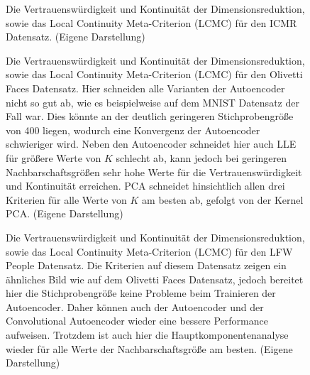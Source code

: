 \begin{figure}[ht]
	\begin{center}
		
	\end{center}
	\caption[ICMR Qualitätskriterien]{Die Vertrauenswürdigkeit und Kontinuität der Dimensionsreduktion, sowie das Local Continuity Meta-Criterion (LCMC) für den ICMR Datensatz. (Eigene Darstellung)}
	\label{fig:ICMRMetrics}
\end{figure}

\begin{figure}[ht]
	\begin{center}
		
	\end{center}
	\caption[Olivetti Faces Qualitätskriterien]{Die Vertrauenswürdigkeit und Kontinuität der Dimensionsreduktion, sowie das Local Continuity Meta-Criterion (LCMC) für den Olivetti Faces Datensatz. Hier schneiden alle Varianten der Autoencoder nicht so gut ab, wie es beispielweise auf dem MNIST Datensatz der Fall war. Dies könnte an der deutlich geringeren Stichprobengröße von 400 liegen, wodurch eine Konvergenz der Autoencoder schwieriger wird. Neben den Autoencoder schneidet hier auch LLE für größere Werte von $K$ schlecht ab, kann jedoch bei geringeren Nachbarschaftsgrößen sehr hohe Werte für die Vertrauenswürdigkeit und Kontinuität erreichen. PCA schneidet hinsichtlich allen drei Kriterien für alle Werte von $K$ am besten ab, gefolgt von der Kernel PCA. (Eigene Darstellung)}
	\label{fig:OlivettiFacesMetrics}
\end{figure}

\begin{figure}[ht]
	\begin{center}
		
	\end{center}
	\caption[LFW People Qualitätskriterien]{Die Vertrauenswürdigkeit und Kontinuität der Dimensionsreduktion, sowie das Local Continuity Meta-Criterion (LCMC) für den LFW People Datensatz. Die Kriterien auf diesem Datensatz zeigen ein ähnliches Bild wie auf dem Olivetti Faces Datensatz, jedoch bereitet hier die Stichprobengröße keine Probleme beim Trainieren der Autoencoder. Daher können auch der Autoencoder und der Convolutional Autoencoder wieder eine bessere Performance aufweisen. Trotzdem ist auch hier die Hauptkomponentenanalyse wieder für alle Werte der Nachbarschaftsgröße am besten. (Eigene Darstellung)}
	\label{fig:LfwPeopleMetrics}
\end{figure}

